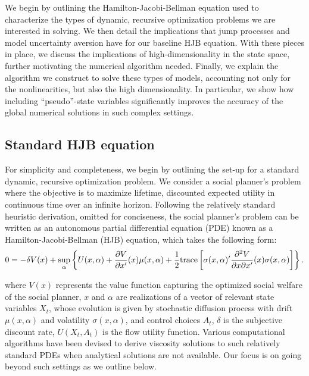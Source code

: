 \documentclass[12pt]{article}
\begin{document}
We begin by outlining the Hamilton-Jacobi-Bellman equation used to characterize the types of dynamic, recursive optimization problems we are interested in solving. We then detail the implications that jump processes and model uncertainty aversion have for our baseline HJB equation. With these pieces in place, we discuss the implications of high-dimensionality in the state space, further motivating the numerical algorithm needed. Finally, we explain the algorithm we construct to solve these types of models, accounting not only for the nonlinearities, but also the high dimensionality. In particular, we show how including ``pseudo''-state variables significantly improves the accuracy of the global numerical solutions in such complex settings.

\subsection{Standard HJB equation}

For simplicity and completeness, we begin by outlining the set-up for a standard dynamic, recursive optimization problem. We consider a social planner's problem where the objective is to maximize lifetime, discounted expected utility in continuous time over an infinite horizon. Following the relatively standard heuristic derivation, omitted for conciseness, the social planner's problem can be written as an autonomous partial differential equation (PDE) known as a Hamilton-Jacobi-Bellman (HJB) equation, which takes the following form:
\begin{eqnarray*} \label{diffusion_no_distortion} 
0 = -\delta V(x) + \sup_\alpha\left\{U(x, \alpha) + \frac{\partial V }{\partial x'}(x)\mu(x,\alpha) + \frac 1 2 {\rm trace}\left[\sigma(x,\alpha)' \frac{\partial^2 V }{\partial x \partial x'}(x)\sigma(x,\alpha)\right]\right\} .
\end{eqnarray*}

where $V(x)$ represents the value function capturing the optimized social welfare of the social planner, $x$ and $\alpha$ are realizations of a vector of relevant state variables $X_t$, whose evolution is given by stochastic diffusion process with drift $\mu(x,\alpha)$ and volatility $\sigma(x,\alpha)$, and control choices $A_t$, $\delta$ is the subjective discount rate, $U(X_t, A_t)$ is the flow utility function. Various computational algorithms have been devised to derive viscosity solutions to such relatively standard PDEs when analytical solutions are not available. Our focus is on going beyond such settings as we outline below.
\end{document}

